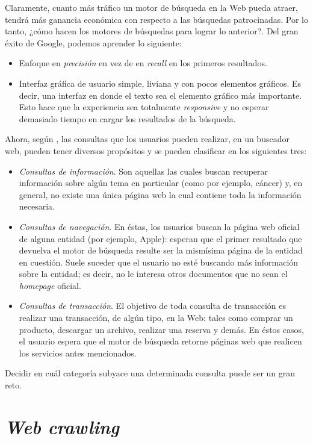 	Claramente, cuanto más tráfico un motor de búsqueda en la Web pueda atraer, tendrá más ganancia económica con respecto a las búsquedas patrocinadas. Por lo tanto, ¿cómo hacen los motores de búsquedas para lograr lo anterior?. Del gran éxito de Google, podemos aprender lo siguiente:
	\begin{itemize}
		\item Enfoque en \textit{precisión} en vez de en \textit{recall} en los primeros resultados.
		\item Interfaz gráfica de usuario simple, liviana y con pocos elementos gráficos. Es decir, una interfaz en donde el texto sea el elemento gráfico más importante. Esto hace que la experiencia sea totalmente \textit{responsive} y no esperar demasiado tiempo en cargar los resultados de la búsqueda.
	\end{itemize}
	
	Ahora, según \cite{manning2009}, las consultas que los usuarios pueden realizar, en un buscador web, pueden tener diversos propósitos y se pueden clasificar en los siguientes tres:
	\begin{itemize}
		\item \textit{Consultas de información}. Son aquellas las cuales buscan recuperar información sobre algún tema en particular (como por ejemplo, cáncer) y, en general, no existe una única página web la cual contiene toda la información necesaria.
		\item \textit{Consultas de navegación}. En éstas, los usuarios buscan la página web oficial de alguna entidad (por ejemplo, Apple): esperan que el primer resultado que devuelva el motor de búsqueda resulte ser la mismísima página de la entidad en cuestión. Suele suceder que el usuario no esté buscando más información sobre la entidad; es decir, no le interesa otros documentos que no sean el \textit{homepage} oficial.
		\item \textit{Consultas de transacción}. El objetivo de toda consulta de transacción es realizar una transacción, de algún tipo, en la Web: tales como comprar un producto, descargar un archivo, realizar una reserva y demás. En éstos casos, el usuario espera que el motor de búsqueda retorne páginas web que realicen los servicios antes mencionados.
	\end{itemize}
	
	Decidir en cuál categoría subyace una determinada consulta puede ser un gran reto.
	
\section{\textit{Web crawling}}
